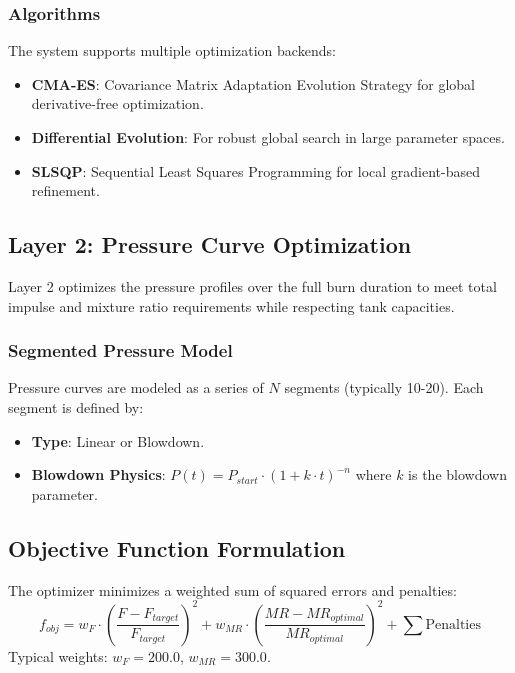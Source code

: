 \subsubsection{Algorithms}
The system supports multiple optimization backends:
\begin{itemize}
    \item \textbf{CMA-ES}: Covariance Matrix Adaptation Evolution Strategy for global derivative-free optimization.
    \item \textbf{Differential Evolution}: For robust global search in large parameter spaces.
    \item \textbf{SLSQP}: Sequential Least Squares Programming for local gradient-based refinement.
\end{itemize}

\subsection{Layer 2: Pressure Curve Optimization}
Layer 2 optimizes the pressure profiles over the full burn duration to meet total impulse and mixture ratio requirements while respecting tank capacities.

\subsubsection{Segmented Pressure Model}
Pressure curves are modeled as a series of \(N\) segments (typically 10-20). Each segment is defined by:
\begin{itemize}
    \item \textbf{Type}: Linear or Blowdown.
    \item \textbf{Blowdown Physics}: \(P(t) = P_{start} \cdot (1 + k \cdot t)^{-n}\) where \(k\) is the blowdown parameter.
\end{itemize}

\subsection{Objective Function Formulation}
The optimizer minimizes a weighted sum of squared errors and penalties:
\begin{equation}
f_{obj} = w_F \cdot \left(\frac{F - F_{target}}{F_{target}}\right)^2 + w_{MR} \cdot \left(\frac{MR - MR_{optimal}}{MR_{optimal}}\right)^2 + \sum \text{Penalties}
\end{equation}
Typical weights: \(w_F = 200.0\), \(w_{MR} = 300.0\).


